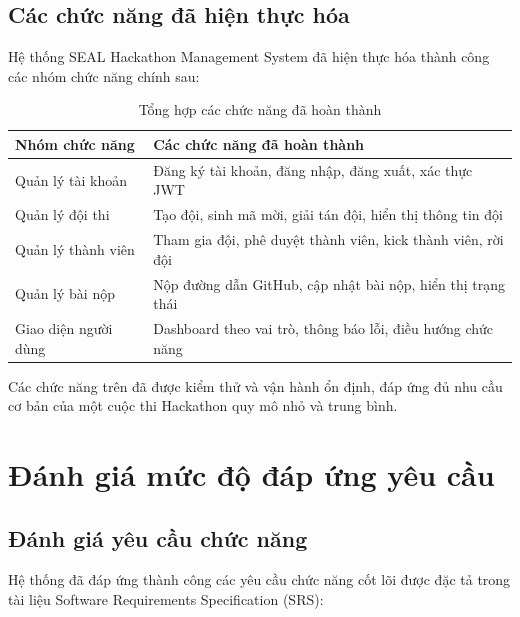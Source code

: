 \documentclass[12pt,a4paper]{report}
\begin{document}

\subsection{Các chức năng đã hiện thực hóa}

Hệ thống SEAL Hackathon Management System đã hiện thực hóa thành công các nhóm chức năng chính sau:

\begin{table}[H]
	\centering
	\caption{Tổng hợp các chức năng đã hoàn thành}
	\label{tab:completed-features}
	\renewcommand{\arraystretch}{1.3}
	\begin{tabular}{|p{4cm}|p{10cm}|}
		\hline
		\textbf{Nhóm chức năng} & \textbf{Các chức năng đã hoàn thành} \\
		\hline
		Quản lý tài khoản & Đăng ký tài khoản, đăng nhập, đăng xuất, xác thực JWT \\
		\hline
		Quản lý đội thi & Tạo đội, sinh mã mời, giải tán đội, hiển thị thông tin đội \\
		\hline
		Quản lý thành viên & Tham gia đội, phê duyệt thành viên, kick thành viên, rời đội \\
		\hline
		Quản lý bài nộp & Nộp đường dẫn GitHub, cập nhật bài nộp, hiển thị trạng thái \\
		\hline
		Giao diện người dùng & Dashboard theo vai trò, thông báo lỗi, điều hướng chức năng \\
		\hline
	\end{tabular}
\end{table}

Các chức năng trên đã được kiểm thử và vận hành ổn định, đáp ứng đủ nhu cầu cơ bản của một cuộc thi Hackathon quy mô nhỏ và trung bình.


\section{Đánh giá mức độ đáp ứng yêu cầu}

\subsection{Đánh giá yêu cầu chức năng}

Hệ thống đã đáp ứng thành công các yêu cầu chức năng cốt lõi được đặc tả trong tài liệu Software Requirements Specification (SRS):
\end{document}
